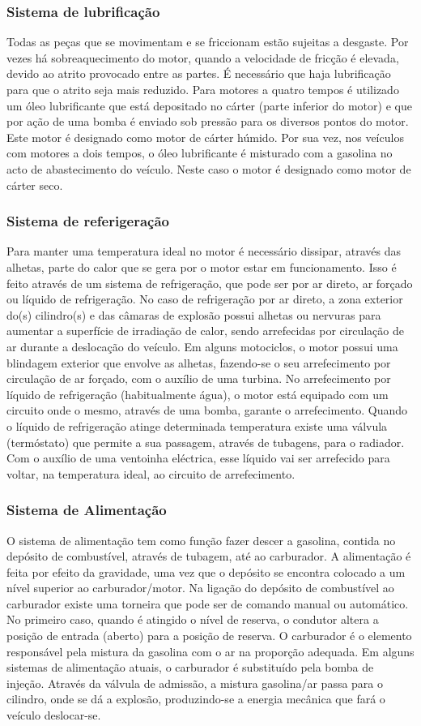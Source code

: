 \documentclass{report}
\begin{document}
\subsubsection{Sistema de lubrificação}
Todas as peças que se movimentam e se friccionam estão sujeitas a desgaste. Por vezes há sobreaquecimento do motor, quando a velocidade de fricção é elevada, devido ao atrito provocado entre as partes. É necessário que haja lubrificação para que o atrito seja mais reduzido.
Para motores a quatro tempos é utilizado um óleo lubrificante que está depositado no cárter (parte inferior do motor) e que por ação de uma bomba é enviado sob pressão para os diversos pontos do motor. Este motor é designado como motor de cárter húmido.
Por sua vez, nos veículos com motores a dois tempos, o óleo lubrificante é misturado com a gasolina no acto de abastecimento do veículo. Neste caso o motor é designado como motor de cárter seco.
\subsubsection{Sistema de referigeração}
Para manter uma temperatura ideal no motor é necessário dissipar, através das alhetas, parte do calor que se gera por o motor estar em funcionamento. Isso é feito através de um sistema de refrigeração, que pode ser por ar direto, ar forçado ou líquido de refrigeração.
No caso de refrigeração por ar direto, a zona exterior do(s) cilindro(s) e das câmaras de explosão possui alhetas ou nervuras para aumentar a superfície de irradiação de calor, sendo arrefecidas por circulação de ar durante a deslocação do veículo.
Em alguns motociclos, o motor possui uma blindagem exterior que envolve as alhetas, fazendo-se o seu arrefecimento por circulação de ar forçado, com o auxílio de uma turbina.
No arrefecimento por líquido de refrigeração (habitualmente água), o motor está equipado com um circuito onde o mesmo, através de uma bomba, garante o arrefecimento. Quando o líquido de refrigeração atinge determinada temperatura existe uma válvula (termóstato) que permite a sua passagem, através de tubagens, para o radiador. Com o auxílio de uma ventoinha eléctrica, esse líquido vai ser arrefecido para voltar, na temperatura ideal, ao circuito de arrefecimento.
\subsubsection{Sistema de Alimentação}
O sistema de alimentação tem como função fazer descer a gasolina, contida no depósito de combustível, através de tubagem, até ao carburador. A alimentação é feita por efeito da gravidade, uma vez que o depósito se encontra colocado a um nível superior ao carburador/motor.
Na ligação do depósito de combustível ao carburador existe uma torneira que pode ser de comando manual ou automático. No primeiro caso, quando é atingido o nível de reserva, o condutor altera a posição de entrada (aberto) para a posição de reserva. O carburador é o elemento responsável pela mistura da gasolina com o ar na proporção adequada. Em alguns sistemas de alimentação atuais, o carburador é substituído pela bomba de injeção.
Através da válvula de admissão, a mistura gasolina/ar passa para o cilindro, onde se dá a explosão, produzindo-se a energia mecânica que fará o veículo deslocar-se.
\end{document}
